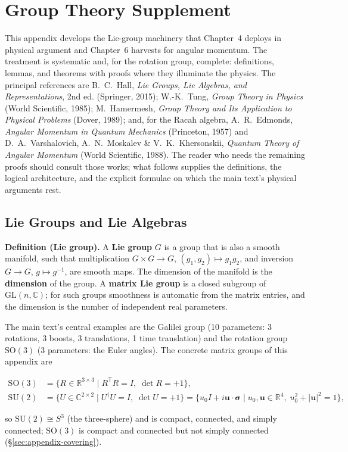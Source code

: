 \chapter{Group Theory Supplement}

\begin{note}
This appendix develops the Lie-group machinery that Chapter~4 deploys in physical argument and Chapter~6 harvests for angular momentum. The treatment is systematic and, for the rotation group, complete: definitions, lemmas, and theorems with proofs where they illuminate the physics. The principal references are B.~C.~Hall, \emph{Lie Groups, Lie Algebras, and Representations}, 2nd ed. (Springer, 2015); W.-K.~Tung, \emph{Group Theory in Physics} (World Scientific, 1985); M.~Hamermesh, \emph{Group Theory and Its Application to Physical Problems} (Dover, 1989); and, for the Racah algebra, A.~R.~Edmonds, \emph{Angular Momentum in Quantum Mechanics} (Princeton, 1957) and D.~A.~Varshalovich, A.~N.~Moskalev \& V.~K.~Khersonskii, \emph{Quantum Theory of Angular Momentum} (World Scientific, 1988). The reader who needs the remaining proofs should consult those works; what follows supplies the definitions, the logical architecture, and the explicit formulae on which the main text's physical arguments rest.
\end{note}

\section{Lie Groups and Lie Algebras}
\label{sec:appendix-lie-groups}

\medskip\noindent\textbf{Definition (Lie group).} A \textbf{Lie group} $G$ is a group that is also a smooth manifold, such that multiplication $G\times G\to G$, $(g_{1},g_{2})\mapsto g_{1}g_{2}$, and inversion $G\to G$, $g\mapsto g^{-1}$, are smooth maps. The dimension of the manifold is the \textbf{dimension} of the group. A \textbf{matrix Lie group} is a closed subgroup of $\mathrm{GL}(n,\mathbb{C})$; for such groups smoothness is automatic from the matrix entries, and the dimension is the number of independent real parameters.

The main text's central examples are the Galilei group (10 parameters: 3 rotations, 3 boosts, 3 translations, 1 time translation) and the rotation group $\mathrm{SO}(3)$ (3 parameters: the Euler angles). The concrete matrix groups of this appendix are
\begin{linenomath}
\begin{align*}
\mathrm{SO}(3) &= \{R\in\mathbb{R}^{3\times3}\mid R^{\mathsf T}R=I,\;\det R=+1\},\\
\mathrm{SU}(2) &= \{U\in\mathbb{C}^{2\times2}\mid U^{\dagger}U=I,\;\det U=+1\}
 = \{u_{0}I+i\bm u\!\cdot\!\bm\sigma\mid u_{0},\bm u\in\mathbb{R}^{4},\;u_{0}^{2}+|\bm u|^{2}=1\},
\end{align*}
\end{linenomath}
so $\mathrm{SU}(2)\cong S^{3}$ (the three-sphere) and is compact, connected, and simply connected; $\mathrm{SO}(3)$ is compact and connected but not simply connected (\S\ref{sec:appendix-covering}).

